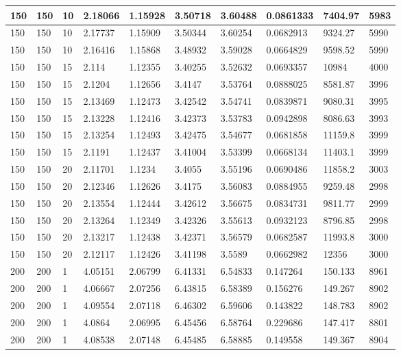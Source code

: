 \begin{landscape}
\begin{longtable}{ | l | l | l | l | l | l | l | l | l | l | }
150 & 150 & 10 & 2.18066 & 1.15928 & 3.50718 & 3.60488 & 0.0861333 & 7404.97 & 5983\\ \hline
150 & 150 & 10 & 2.17737 & 1.15909 & 3.50344 & 3.60254 & 0.0682913 & 9324.27 & 5990\\ \hline
150 & 150 & 10 & 2.16416 & 1.15868 & 3.48932 & 3.59028 & 0.0664829 & 9598.52 & 5990\\ \hline
150 & 150 & 15 & 2.114 & 1.12355 & 3.40255 & 3.52632 & 0.0693357 & 10984 & 4000\\ \hline
150 & 150 & 15 & 2.1204 & 1.12656 & 3.4147 & 3.53764 & 0.0888025 & 8581.87 & 3996\\ \hline
150 & 150 & 15 & 2.13469 & 1.12473 & 3.42542 & 3.54741 & 0.0839871 & 9080.31 & 3995\\ \hline
150 & 150 & 15 & 2.13228 & 1.12416 & 3.42373 & 3.53783 & 0.0942898 & 8086.63 & 3993\\ \hline
150 & 150 & 15 & 2.13254 & 1.12493 & 3.42475 & 3.54677 & 0.0681858 & 11159.8 & 3999\\ \hline
150 & 150 & 15 & 2.1191 & 1.12437 & 3.41004 & 3.53399 & 0.0668134 & 11403.1 & 3999\\ \hline
150 & 150 & 20 & 2.11701 & 1.1234 & 3.4055 & 3.55196 & 0.0690486 & 11858.2 & 3003\\ \hline
150 & 150 & 20 & 2.12346 & 1.12626 & 3.4175 & 3.56083 & 0.0884955 & 9259.48 & 2998\\ \hline
150 & 150 & 20 & 2.13554 & 1.12444 & 3.42612 & 3.56675 & 0.0834731 & 9811.77 & 2999\\ \hline
150 & 150 & 20 & 2.13264 & 1.12349 & 3.42326 & 3.55613 & 0.0932123 & 8796.85 & 2998\\ \hline
150 & 150 & 20 & 2.13217 & 1.12438 & 3.42371 & 3.56579 & 0.0682587 & 11993.8 & 3000\\ \hline
150 & 150 & 20 & 2.12117 & 1.12426 & 3.41198 & 3.5589 & 0.0662982 & 12356 & 3000\\ \hline
200 & 200 & 1 & 4.05151 & 2.06799 & 6.41331 & 6.54833 & 0.147264 & 150.133 & 8961\\ \hline
200 & 200 & 1 & 4.06667 & 2.07256 & 6.43815 & 6.58389 & 0.156276 & 149.267 & 8902\\ \hline
200 & 200 & 1 & 4.09554 & 2.07118 & 6.46302 & 6.59606 & 0.143822 & 148.783 & 8902\\ \hline
200 & 200 & 1 & 4.0864 & 2.06995 & 6.45456 & 6.58764 & 0.229686 & 147.417 & 8801\\ \hline
200 & 200 & 1 & 4.08538 & 2.07148 & 6.45485 & 6.58885 & 0.149558 & 149.367 & 8904\\ \hline

\end{longtable}
\end{landscape}
